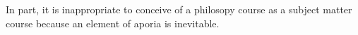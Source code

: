 \documentclass[letterpaper,notitlepage,12pt]{article}
\begin{document}
In part, it is inappropriate to conceive of a philosopy course as a subject
matter course because an element of aporia is inevitable.












































\nocite{plato_theaetetus_nodate}

\printbibliography
\end{document}
